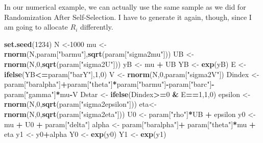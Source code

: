 \documentclass[]{book}
\newenvironment{Shaded}{\begin{snugshade}}{\end{snugshade}}
\newcommand{\KeywordTok}[1]{\textcolor[rgb]{0.13,0.29,0.53}{\textbf{#1}}}
\newcommand{\DecValTok}[1]{\textcolor[rgb]{0.00,0.00,0.81}{#1}}
\newcommand{\StringTok}[1]{\textcolor[rgb]{0.31,0.60,0.02}{#1}}
\newcommand{\OperatorTok}[1]{\textcolor[rgb]{0.81,0.36,0.00}{\textbf{#1}}}
\newcommand{\NormalTok}[1]{#1}
\theoremstyle{definition}
\theoremstyle{definition}
\theoremstyle{definition}
\theoremstyle{remark}
\let\BeginKnitrBlock\begin \let\EndKnitrBlock\end
\begin{document}
\BeginKnitrBlock{example}
\protect\hypertarget{exm:unnamed-chunk-93}{}{\label{exm:unnamed-chunk-93}
}In our numerical example, we can actually use the same sample as we did
for Randomization After Self-Selection. I have to generate it again,
though, since I am going to allocate \(R_i\) differently.
\EndKnitrBlock{example}

\begin{Shaded}
\begin{Highlighting}[]
\KeywordTok{set.seed}\NormalTok{(}\DecValTok{1234}\NormalTok{)}
\NormalTok{N <-}\DecValTok{1000}
\NormalTok{mu <-}\StringTok{ }\KeywordTok{rnorm}\NormalTok{(N,param[}\StringTok{"barmu"}\NormalTok{],}\KeywordTok{sqrt}\NormalTok{(param[}\StringTok{"sigma2mu"}\NormalTok{]))}
\NormalTok{UB <-}\StringTok{ }\KeywordTok{rnorm}\NormalTok{(N,}\DecValTok{0}\NormalTok{,}\KeywordTok{sqrt}\NormalTok{(param[}\StringTok{"sigma2U"}\NormalTok{]))}
\NormalTok{yB <-}\StringTok{ }\NormalTok{mu }\OperatorTok{+}\StringTok{ }\NormalTok{UB }
\NormalTok{YB <-}\StringTok{ }\KeywordTok{exp}\NormalTok{(yB)}
\NormalTok{E <-}\StringTok{ }\KeywordTok{ifelse}\NormalTok{(YB}\OperatorTok{<=}\NormalTok{param[}\StringTok{"barY"}\NormalTok{],}\DecValTok{1}\NormalTok{,}\DecValTok{0}\NormalTok{)}
\NormalTok{V <-}\StringTok{ }\KeywordTok{rnorm}\NormalTok{(N,}\DecValTok{0}\NormalTok{,param[}\StringTok{"sigma2V"}\NormalTok{])}
\NormalTok{Dindex <-}\StringTok{ }\NormalTok{param[}\StringTok{"baralpha"}\NormalTok{]}\OperatorTok{+}\NormalTok{param[}\StringTok{"theta"}\NormalTok{]}\OperatorTok{*}\NormalTok{param[}\StringTok{"barmu"}\NormalTok{]}\OperatorTok{-}\NormalTok{param[}\StringTok{"barc"}\NormalTok{]}\OperatorTok{-}\NormalTok{param[}\StringTok{"gamma"}\NormalTok{]}\OperatorTok{*}\NormalTok{mu}\OperatorTok{-}\NormalTok{V}
\NormalTok{Dstar <-}\StringTok{ }\KeywordTok{ifelse}\NormalTok{(Dindex}\OperatorTok{>=}\DecValTok{0} \OperatorTok{&}\StringTok{ }\NormalTok{E}\OperatorTok{==}\DecValTok{1}\NormalTok{,}\DecValTok{1}\NormalTok{,}\DecValTok{0}\NormalTok{)}
\NormalTok{epsilon <-}\StringTok{ }\KeywordTok{rnorm}\NormalTok{(N,}\DecValTok{0}\NormalTok{,}\KeywordTok{sqrt}\NormalTok{(param[}\StringTok{"sigma2epsilon"}\NormalTok{]))}
\NormalTok{eta<-}\StringTok{ }\KeywordTok{rnorm}\NormalTok{(N,}\DecValTok{0}\NormalTok{,}\KeywordTok{sqrt}\NormalTok{(param[}\StringTok{"sigma2eta"}\NormalTok{]))}
\NormalTok{U0 <-}\StringTok{ }\NormalTok{param[}\StringTok{"rho"}\NormalTok{]}\OperatorTok{*}\NormalTok{UB }\OperatorTok{+}\StringTok{ }\NormalTok{epsilon}
\NormalTok{y0 <-}\StringTok{ }\NormalTok{mu }\OperatorTok{+}\StringTok{  }\NormalTok{U0 }\OperatorTok{+}\StringTok{ }\NormalTok{param[}\StringTok{"delta"}\NormalTok{]}
\NormalTok{alpha <-}\StringTok{ }\NormalTok{param[}\StringTok{"baralpha"}\NormalTok{]}\OperatorTok{+}\StringTok{  }\NormalTok{param[}\StringTok{"theta"}\NormalTok{]}\OperatorTok{*}\NormalTok{mu }\OperatorTok{+}\StringTok{ }\NormalTok{eta}
\NormalTok{y1 <-}\StringTok{ }\NormalTok{y0}\OperatorTok{+}\NormalTok{alpha}
\NormalTok{Y0 <-}\StringTok{ }\KeywordTok{exp}\NormalTok{(y0)}
\NormalTok{Y1 <-}\StringTok{ }\KeywordTok{exp}\NormalTok{(y1)}
\end{Highlighting}
\end{Shaded}
\end{document}
